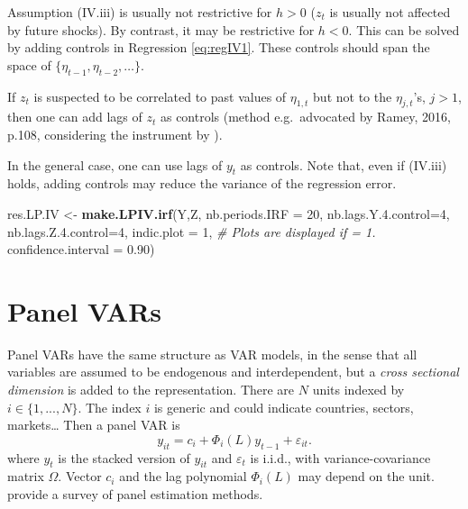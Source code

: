 \documentclass[
  12pt,
]{book}
\newenvironment{Shaded}{\begin{snugshade}}{\end{snugshade}}
\newcommand{\AttributeTok}[1]{\textcolor[rgb]{0.13,0.29,0.53}{#1}}
\newcommand{\CommentTok}[1]{\textcolor[rgb]{0.56,0.35,0.01}{\textit{#1}}}
\newcommand{\DecValTok}[1]{\textcolor[rgb]{0.00,0.00,0.81}{#1}}
\newcommand{\FloatTok}[1]{\textcolor[rgb]{0.00,0.00,0.81}{#1}}
\newcommand{\FunctionTok}[1]{\textcolor[rgb]{0.13,0.29,0.53}{\textbf{#1}}}
\newcommand{\NormalTok}[1]{#1}
\newcommand{\OtherTok}[1]{\textcolor[rgb]{0.56,0.35,0.01}{#1}}
\theoremstyle{definition}
\theoremstyle{definition}
\theoremstyle{definition}
\theoremstyle{definition}
\theoremstyle{remark}
\begin{document}
Assumption (IV.iii) is usually not restrictive for \(h>0\) (\(z_t\) is usually not affected by future shocks). By contrast, it may be restrictive for \(h<0\). This can be solved by adding controls in Regression \eqref{eq:regIV1}. These controls should span the space of \(\{\eta_{t-1},\eta_{t-2},\dots\}\).

If \(z_t\) is suspected to be correlated to past values of \(\eta_{1,t}\) but not to the \(\eta_{j,t}\)'s, \(j>1\), then one can add lags of \(z_t\) as controls (method e.g.~advocated by Ramey, 2016, p.108, considering the instrument by \citet{Gertler_Karadi_2015}).

In the general case, one can use lags of \(y_t\) as controls. Note that, even if (IV.iii) holds, adding controls may reduce the variance of the regression error.

\begin{Shaded}
\begin{Highlighting}[]
\NormalTok{res.LP.IV }\OtherTok{\textless{}{-}} \FunctionTok{make.LPIV.irf}\NormalTok{(Y,Z,}
                           \AttributeTok{nb.periods.IRF =} \DecValTok{20}\NormalTok{,}
                           \AttributeTok{nb.lags.Y.4.control=}\DecValTok{4}\NormalTok{,}
                           \AttributeTok{nb.lags.Z.4.control=}\DecValTok{4}\NormalTok{,}
                           \AttributeTok{indic.plot =} \DecValTok{1}\NormalTok{, }\CommentTok{\# Plots are displayed if = 1.}
                           \AttributeTok{confidence.interval =} \FloatTok{0.90}\NormalTok{)}
\end{Highlighting}
\end{Shaded}

\chapter{Panel VARs}\label{PanelVARs}

Panel VARs have the same structure as VAR models, in the
sense that all variables are assumed to be endogenous and
interdependent, but a \emph{cross sectional dimension} is
added to the representation. There are \(N\) units indexed by
\(i\in\{1,...,N\}\). The index \(i\) is generic and could indicate
countries, sectors, markets\ldots{} Then a panel VAR is
\[ y_{it}=c_i+\Phi_i(L)
y_{t-1}+\varepsilon_{it}.\] where \(y_t\) is the stacked version of
\(y_{it}\) and \(\varepsilon_t\) is i.i.d., with variance-covariance
matrix \(\Omega\). Vector \(c_i\) and the lag polynomial \(\Phi_i(L)\) may depend on the unit. \citet{Canova_Cicarelli_2013} provide a survey of panel estimation methods.
\end{document}
